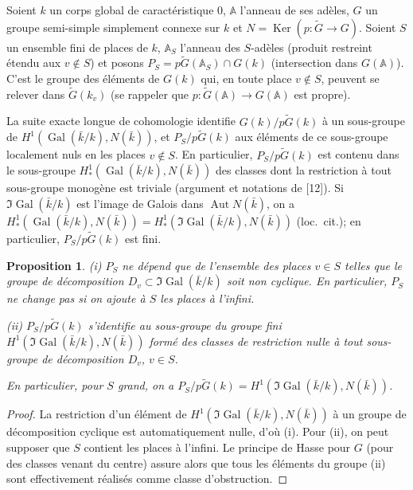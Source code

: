 \documentclass[12pt,a4paper]{article}
\theoremstyle{plain}
\newtheorem{proposition}[theorem]{Proposition}
\theoremstyle{definition}
\theoremstyle{remark}
\DeclareMathOperator{\Gal}{Gal}
\DeclareMathOperator{\Ker}{Ker}
\DeclareMathOperator{\Aut}{Aut}
\newcommand{\A}{\mathbb{A}}
\begin{document}
\subsubsection{}

Soient $k$ un corps global de caract\'eristique 0, $\A$ l'anneau de ses ad\`eles, $G$ un groupe semi-simple simplement connexe sur $k$ et $N = \Ker(p:\tilde{G} \to G)$. Soient $S$ un ensemble fini de places de $k$, $\A_S$ l'anneau des $S$-ad\`eles (produit restreint \'etendu aux $v \notin S$) et posons $P_S = p\tilde{G}(\A_S) \cap G(k)$ (intersection dans $G(\A)$). C'est le groupe des \'el\'ements de $G(k)$ qui, en toute place $v \notin S$, peuvent se relever dans $\tilde{G}(k_v)$ (se rappeler que $p:\tilde{G}(\A) \to G(\A)$ est propre).

La suite exacte longue de cohomologie identifie $G(k)/p\tilde{G}(k)$ \`a un sous-groupe de $H^1(\Gal(\bar{k}/k), N(\bar{k}))$, et $P_S/p\tilde{G}(k)$ aux \'el\'ements de ce sous-groupe localement nuls en les places $v \notin S$. En particulier, $P_S/p\tilde{G}(k)$ est contenu dans le sous-groupe $H^1_*(\Gal(\bar{k}/k), N(\bar{k}))$ des classes dont la restriction \`a tout sous-groupe monog\`ene est triviale (argument et notations de [12]). Si $\Im \Gal(\bar{k}/k)$ est l'image de Galois dans $\Aut N(\bar{k})$, on a $H^1_*(\Gal(\bar{k}/k), N(\bar{k})) = H^1_*(\Im \Gal(\bar{k}/k), N(\bar{k}))$ (loc.~cit.); en particulier, $P_S/p\tilde{G}(k)$ est fini.

\begin{proposition}
\textup{(i)} $P_S$ ne d\'epend que de l'ensemble des places $v \in S$ telles que le groupe de d\'ecomposition $D_v \subset \Im \Gal(\bar{k}/k)$ soit non cyclique. En particulier, $P_S$ ne change pas si on ajoute \`a $S$ les places \`a l'infini.

\textup{(ii)} $P_S/p\tilde{G}(k)$ s'identifie au sous-groupe du groupe fini $H^1(\Im \Gal(\bar{k}/k), N(\bar{k}))$ form\'e des classes de restriction nulle \`a tout sous-groupe de d\'ecomposition $D_v$, $v \in S$.

En particulier, pour $S$ grand, on a $P_S/p\tilde{G}(k) = H^1(\Im \Gal(\bar{k}/k), N(\bar{k}))$.
\end{proposition}

\begin{proof}
La restriction d'un \'el\'ement de $H^1(\Im \Gal(\bar{k}/k), N(\bar{k}))$ \`a un groupe de d\'ecomposition cyclique est automatiquement nulle, d'o\`u (i). Pour (ii), on peut supposer que $S$ contient les places \`a l'infini. Le principe de Hasse pour $G$ (pour des classes venant du centre) assure alors que tous les \'el\'ements du groupe (ii) sont effectivement r\'ealis\'es comme classe d'obstruction.
\end{proof}
\end{document}
